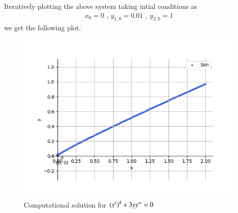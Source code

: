 \documentclass[journal]{IEEEtran}
\begin{document}
Iteratively plotting the above system taking intial conditions as 
\begin{align}
    x_0 = 0 \text{ , } y_{1, 0} = 0.01 \text{ , } y_{2, 0} = 1
\end{align}
we get the following plot.

\begin{figure}[h!]
   \centering
   \includegraphics[width=0.7\columnwidth]{figs/graph.png}
   \caption{Computational solution for $\left(y^{\prime}\right)^4 + 3yy^{\prime\prime} = 0$}
   \label{label}
\end{figure}
\end{document}
